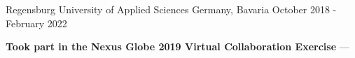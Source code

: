 

\begin{cventries}
  \cventry
    {} %
    {Regensburg University of Applied Sciences} %
    {Germany, Bavaria} %
    {October 2018 - February 2022} %
    {
      \begin{cvitems} %
         \item {\textbf{Took part in the Nexus Globe 2019 Virtual Collaboration Exercise} --- }
      \end{cvitems}
    }
\end{cventries}